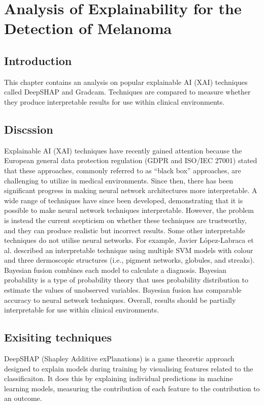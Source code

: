 \chapter{Analysis of Explainability for the Detection of Melanoma}

\section{Introduction}
This chapter contains an analysis on popular explainable AI (XAI) techniques called DeepSHAP and Gradcam. Techniques are compared to measure whether they produce interpretable results for use within clinical environments. 

\section{Discssion}
Explainable AI (XAI) techniques have recently gained attention because the European general data protection regulation (GDPR and ISO/IEC 27001) stated that these approaches, commonly referred to as ``black box'' approaches, are challenging to utilize in medical environments. Since then, there has been significant progress in making neural network architectures more interpretable. A wide range of techniques\cite{Fuji2019,  Selvaraju2016, Ribeiro2016} have since been developed, demonstrating that it is possible to make neural network techniques interpretable. However, the problem is instead the current scepticism on whether these techniques are trustworthy\cite{Tjoa2019, Samek2019a}, and they can produce realistic but incorrect results\cite{Ghorbani2019}. Some other interpretable techniques do not utilise neural networks. For example, Javier López-Labraca et al.\cite{Lopez-Labraca2018} described an interpretable technique using multiple SVM models with colour and three dermoscopic structures (i.e., pigment networks, globules, and streaks). Bayesian fusion combines each model to calculate a diagnosis. Bayesian probability is a type of probability theory that uses probability distribution to estimate the values of unobserved variables. Bayesian fusion has comparable accuracy to neural network techniques\cite{Takruri2017}. Overall, results should be partially interpretable for use within clinical environments.

\section{Exisiting techniques}
DeepSHAP (Shapley Additive exPlanations) is a game theoretic approach designed to explain models during training by visualising features related to the classificaiton. It does this by explaining individual predictions in machine learning models, measuring the contribution of each feature to the contribution to an outcome\cite{Aas2021}.


